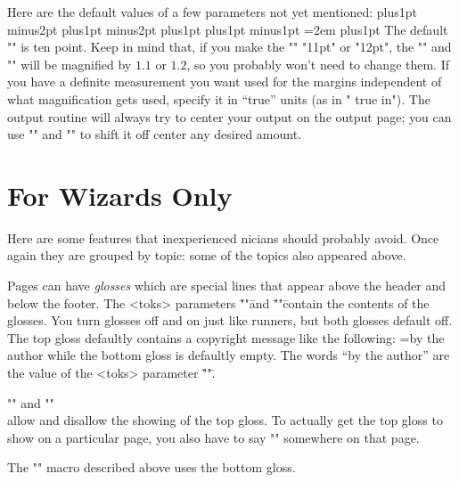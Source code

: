 Here are the default values of a few parameters not yet
mentioned:
\beginverb
\hsize=28pc \vsize=44pc
\abovedisplayskip=3pt plus1pt minus2pt
\belowdisplayskip=3pt plus1pt minus2pt
\abovedisplayshortskip=0pt plus1pt
\belowdisplayshortskip=2pt plus1pt minus1pt
\parindent=2em
\parskip=0pt plus1pt
\normallineskip=2pt
\normallineskiplimit=0pt
\endverb
The default "\typesize" is ten point.  Keep in mind that, if you
make the "\typesize" "11pt" or "12pt", the "\hsize" and "\vsize"
will be magnified by $1.1$ or $1.2$, so you probably won't need
to change them.  If you have a definite measurement you want used
for the margins independent of what magnification gets used,
specify it in ``true'' units (as in " true in").  The
output routine will always try to center your output on the
output page; you can use "\hoffset" and "\voffset" to shift it
off center any desired amount.

\section {For Wizards Only}

Here are some features that inexperienced \tex nicians should
probably avoid.  Once again they are grouped by topic: some of
the topics also appeared above.


Pages can have {\it glosses} which are special lines that appear
above the header and below the footer.  The <toks> parameters
\="\topgloss"\= and \="\bottomgloss"\= contain the contents of
the glosses.  You turn glosses off and on just like runners, but
both glosses default off.  The top gloss defaultly contains a
copyright message like the following:
\begintextlines
\copyrightholder={by the author}%
\line{\the\topgloss}%
\endtextlines
while the bottom gloss is defaultly empty.  The words ``by the
author'' are the value of the <toks> parameter
\="\copyrightholder"\=.

\begingab

\*\:"\showcopyrighttrue"\: and "\showcopyrightfalse"\\allow and
disallow the showing of the top gloss.  To actually get the top
gloss to show on a particular page, you also have to say
\+"\copyrightpage"\+ somewhere on that page.

\endgab

The "\draft" macro described above uses the bottom gloss.


